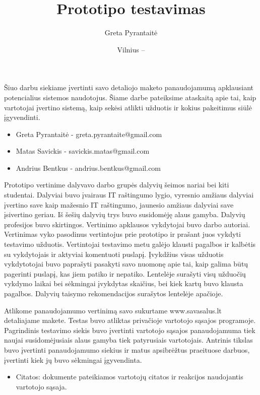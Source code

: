 \documentclass[oneside]{VUMIFPSkursinis}
\title{Prototipo testavimas}
\author{Greta Pyrantaitė}
\date{Vilnius – \the\year}
\begin{document}
\maketitle

Šiuo darbu siekiame įvertinti savo detaliojo maketo panaudojamumą apklausiant potencialius sistemos naudotojus. Šiame darbe pateiksime ataskaitą apie tai, kaip vartotojai įvertino sistemą, kaip sekėsi atlikti užduotis ir kokius pakeitimus siūlė įgyvendinti.

\begin{itemize}
	\item{Greta Pyrantaitė - greta.pyrantaite@gmail.com}
	\item{Matas Savickis - savickis.matas@gmail.com}
	\item{Andrius Bentkus - andrius.bentkus@gmail.com}
\end{itemize}

\tableofcontents


Prototipo vertinime dalyvavo darbo grupės dalyvių šeimos nariai bei kiti studentai.
Dalyviai buvo įvairaus IT raštingumo lygio, vyresnio amžiaus dalyviai įvertino save kaip mažesnio IT raštingumo, jaunesio amžiaus dalyviai save įsivertino geriau.
Iš šešių dalyvių trys buvo susidomėję alaus gamyba. Dalyvių profesijos buvo skirtingos.
Vertinimo apklausos vykdytojai buvo darbo autoriai.
Vertinimas vyko pasodinus vertintojus prie prototipo ir prašant juos vykdyti testavimo užduotis.
Vertintojai testavimo metu galėjo klausti pagalbos ir kalbėtis su vykdytojais ir aktyviai komentuoti puslapį.
Įvykdžius visas užduotis vykdytotojai buvo paprašyti pasakyti savo nuomonę apie tai, kaip galima būtų pagerinti puslapį, kas jiem patiko ir nepatiko.
Lentelėje surašyti visų užduočių vykdymo laikai bei sėkmingai įvykdytas skaičius, bei kiek kartų buvo klausta pagalbos.
Dalyvių taisymo rekomendacijos surašytos lentelėje apačioje.

Atlikome panaudojamumo vertinimą savo sukurtame www.savasalus.lt detaliajame makete. Testas buvo atliktas privačioje vartotojo sąsajos programoje.
		Pagrindinis testavimo siekis buvo įvertinti vartotojo sąsajos panaudojamuma tiek naujai susidomėjusiais alaus gamyba tiek patyrusiais vartotojais. Antrinis tikslas buvo įvertinti panaudojamumo siekius ir matus apsibrėžtus praeituose darbuos, įvertinti kiek jų buvo sėkmingai įgyvendinta.
		\begin{itemize}
			\item{Citatos: dokumente pateikiamos vartotojų citatos ir reakcijos naudojantis vartotojo sąsaja.}
		\end{itemize}
\end{document}
